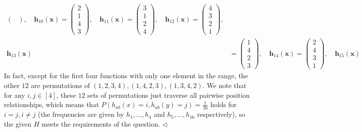 \documentclass[11pt]{article}
\newenvironment{answer}[1][Answer]{\begin{trivlist}
\item[\hskip \labelsep {\bfseries #1.}\hskip \labelsep]}{\hfill$\lhd$\end{trivlist}}
\begin{document}
\begin{answer}
\[\begin{aligned}
\begin{pmatrix}
\end{pmatrix}, \quad
\bm{h}_{10}(\bm{x}) = 
\begin{pmatrix}
2 \\ 1 \\ 4 \\ 3
\end{pmatrix}, \quad
\bm{h}_{11}(\bm{x}) = 
\begin{pmatrix}
3 \\ 1 \\ 2 \\ 4
\end{pmatrix}, \quad
\bm{h}_{12}(\bm{x}) = 
\begin{pmatrix}
4 \\ 3 \\ 2 \\ 1
\end{pmatrix}, \\
\bm{h}_{13}(\bm{x}) &= 
\begin{pmatrix}
1 \\ 4 \\ 2 \\ 3
\end{pmatrix}, \quad
\bm{h}_{14}(\bm{x}) = 
\begin{pmatrix}
2 \\ 4 \\ 3 \\ 1
\end{pmatrix}, \quad
\bm{h}_{15}(\bm{x}) = 
\begin{pmatrix}
3 \\ 2 \\ 4 \\ 1
\end{pmatrix}, \quad
\bm{h}_{16}(\bm{x}) = 
\begin{pmatrix}
4 \\ 2 \\ 1 \\ 3
\end{pmatrix}.
\end{aligned}
\]
In fact, except for the first four functions with only one element in the range, the other $12$ are permutations of $(1,2,3,4),(1,4,2,3),(1,3,4,2)$. We note that for any $i,j\in [4]$, these $12$ sets of permutations just traverse all pairwise position relationships, which means that $P(h_{ab}(x) = i,h_{ab}(y) = j)=\frac{1}{16}$ holds for $i=j,i\neq j$ (the frequencies are given by $h_1,\dots,h_4$ and $h_{5},\dots,h_{16}$ respectively), so the given $H$ meets the requirements of the question.
\end{answer}
\end{document}
